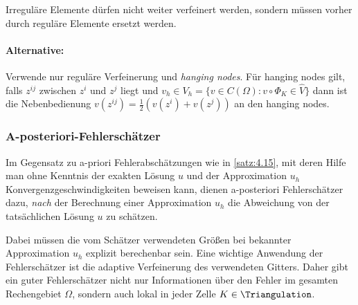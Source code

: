 Irreguläre Elemente dürfen nicht weiter verfeinert werden, sondern müssen
vorher durch reguläre Elemente ersetzt werden.


\paragraph{Alternative:}

Verwende nur reguläre Verfeinerung und \emph{hanging nodes}.
Für hanging nodes gilt, falls $z^{ij}$ zwischen $z^i$ und $z^j$ liegt und
$v_h\in V_h = \{v\in C(\Omega): v \circ \Phi_K \in \hat V\}$ dann ist die
Nebenbedienung $v(z^{ij}) = \frac{1}{2} (v(z^i) + v(z^j))$ an den hanging nodes.


\subsubsection{A-posteriori-Fehlerschätzer}

Im Gegensatz zu a-priori Fehlerabschätzungen wie in \eqref{satz:4.15}, mit deren Hilfe man
ohne Kenntnis der exakten Lösung $u$ und der Approximation $u_h$
Konvergenzgeschwindigkeiten beweisen kann, dienen a-posteriori Fehlerschätzer dazu, \emph{nach}
der Berechnung einer Approximation $u_h$ die Abweichung von der tatsächlichen Lösung $u$ zu schätzen.

Dabei müssen die vom Schätzer verwendeten Größen bei bekannter Approximation $u_h$ explizit berechenbar sein.
Eine wichtige Anwendung der Fehlerschätzer ist die adaptive Verfeinerung des verwendeten Gitters.
Daher gibt ein guter Fehlerschätzer nicht nur Informationen über den Fehler im gesamten Rechengebiet
$\Omega$, sondern auch lokal in jeder Zelle $K \in \Triangulation$.

